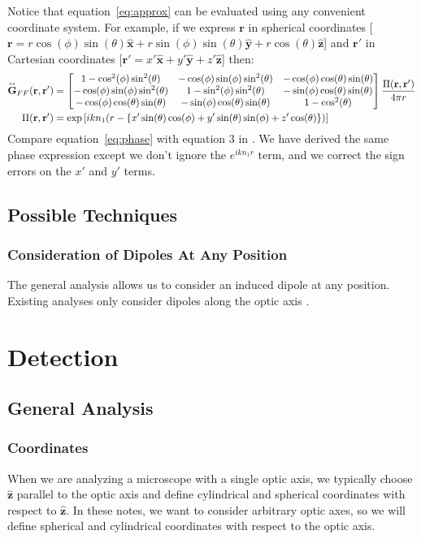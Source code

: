 \documentclass[11pt]{article}
\providecommand{\mb}[1]{\mathbf{#1}}
\providecommand{\mh}[1]{\mathbf{\hat{#1}}}
\newcommand{\tensor}[1]{\overset{\text{\tiny$\leftrightarrow$}}{\mb{#1}}}
\begin{document}
 Notice that equation~\ref{eq:approx} can be evaluated using any convenient coordinate
 system. For example, if we express $\mb{r}$ in spherical coordinates
 [$\mb{r} = r\cos(\phi)\sin(\theta)\mb{\hat{x}} +
 r\sin(\phi)\sin(\theta){\mb{\hat{y}} + r\cos(\theta)\mb{\hat{z}}}$]
 and $\mb{r'}$ in Cartesian coordinates
 [$\mb{r'} = x'\mb{\hat{x}} + y'\mb{\hat{y}} + z'\mb{\hat{z}}$] then:
 \begin{align}
   \tensor{\mb{G}}_{FF}(\mb{r}, \mb{r'}) &=
   \begin{bmatrix}
     1 - \cos^2(\phi)\sin^2(\theta) & -\cos(\phi)\sin(\phi)\sin^2(\theta) & -\cos(\phi)\cos(\theta)\sin(\theta)\\
     -\cos(\phi)\sin(\phi)\sin^2(\theta) & 1 - \sin^2(\phi)\sin^2(\theta)  & -\sin(\phi)\cos(\theta)\sin(\theta) \\
     -\cos(\phi)\cos(\theta)\sin(\theta) & -\sin(\phi)\cos(\theta)\sin(\theta) & 1- \cos^2(\theta)
   \end{bmatrix}\frac{\Pi(\mb{r}, \mb{r'})}{4\pi r}\label{eq:gt}\\
   \Pi(\mb{r}, \mb{r'}) &= \text{exp}\left[ikn_1(r - \{x'\sin(\theta)\cos(\phi) + y'\sin(\theta)\sin(\phi) + z'\cos(\theta)\})\right] \label{eq:phase}
 \end{align}
 Compare equation~\ref{eq:phase} with equation 3 in \cite{agrawal}. We have
 derived the same phase expression except we don't ignore the $e^{ikn_1r}$ term, and we
 correct the sign errors on the $x'$ and $y'$ terms.

 \subsection{Possible Techniques}
 \subsubsection{Consideration of Dipoles At Any Position}
 The general analysis allows us to consider an induced dipole at any position. Existing
 analyses only consider dipoles along the optic axis \cite{backer}. 
 
\section{Detection}
\subsection{General Analysis}
\subsubsection{Coordinates}
When we are analyzing a microscope with a single optic axis, we typically choose
$\mh{z}$ parallel to the optic axis and define cylindrical and spherical
coordinates with respect to $\mh{z}$. In these notes, we want to consider
arbitrary optic axes, so we will define spherical and cylindrical coordinates
with respect to the optic axis.
\end{document}
